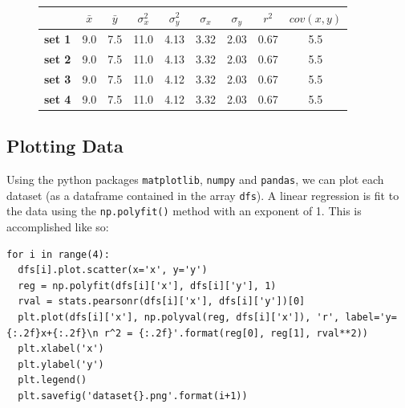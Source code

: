 \documentclass[11pt,a4paper]{article}
\begin{document}
\begin{figure}[]
\centering
\begin{tabular}{l|c|c|c|c|c|c|c|c|}
\cline{2-9}
                                     & \textbf{$\bar{x}$} & \textbf{$\bar{y}$} & \textbf{$\sigma_x^2$} & \textbf{$\sigma_y^2$} & \textbf{$\sigma_x$} & \textbf{$\sigma_y$} & \textbf{$r^2$} & \textbf{$cov(x, y)$} \\ \hline
\multicolumn{1}{|l|}{\textbf{set 1}} & 9.0                & 7.5              & 11.0                & 4.13                & 3.32                  & 2.03                  & 0.67           & 5.5                  \\ \hline
\multicolumn{1}{|l|}{\textbf{set 2}} & 9.0                & 7.5              & 11.0                & 4.13                & 3.32                  & 2.03                  & 0.67           & 5.5                  \\ \hline
\multicolumn{1}{|l|}{\textbf{set 3}} & 9.0                & 7.5              & 11.0                & 4.12                & 3.32                  & 2.03                  & 0.67           & 5.5                  \\ \hline
\multicolumn{1}{|l|}{\textbf{set 4}} & 9.0                & 7.5              & 11.0                & 4.12                & 3.32                  & 2.03                  & 0.67           & 5.5                  \\ \hline
\end{tabular}
\end{figure}

\subsection{Plotting Data}

Using the python packages \texttt{matplotlib}, \texttt{numpy} and \texttt{pandas}, we can plot each dataset (as a dataframe contained in the array \texttt{dfs}). A linear regression is fit to the data using the \texttt{np.polyfit()} method with an exponent of 1. This is accomplished like so:

\begin{lstlisting}
for i in range(4):
  dfs[i].plot.scatter(x='x', y='y') 
  reg = np.polyfit(dfs[i]['x'], dfs[i]['y'], 1)
  rval = stats.pearsonr(dfs[i]['x'], dfs[i]['y'])[0]
  plt.plot(dfs[i]['x'], np.polyval(reg, dfs[i]['x']), 'r', label='y={:.2f}x+{:.2f}\n r^2 = {:.2f}'.format(reg[0], reg[1], rval**2))
  plt.xlabel('x')
  plt.ylabel('y')
  plt.legend()
  plt.savefig('dataset{}.png'.format(i+1))
\end{lstlisting}
\end{document}
